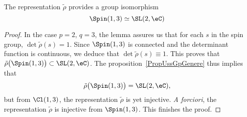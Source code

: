 \begin{theorem}
The representation $\tilde\rho$ provides a group isomorphism
\[
  \Spin(1,3)\simeq \SL(2,\eC)
\]

\end{theorem}

\begin{proof}
In the case $p=2$, $q=3$, the lemma assures us that for each $s$ in the spin group, $\det\tilde\rho(s)=1$. Since $\Spin(1,3)$ is connected and the determinant function is continuous, we deduce that $\det\tilde\rho(s)\equiv 1$. This proves that $\tilde\rho\big( \Spin(1,3) \big)\subset \SL(2,\eC)$. The proposition~\ref{PropUssGpGenere} thus implies that
\[
  \tilde\rho\big( \Spin(1,3) \big)=\SL(2,\eC),
\]
 but from $\Cl(1,3)$, the representation $\tilde\rho$ is yet injective. \emph{A forciori}, the representation $\tilde\rho$ is injective from $\Spin(1,3)$. This finishes the proof.
\end{proof}
